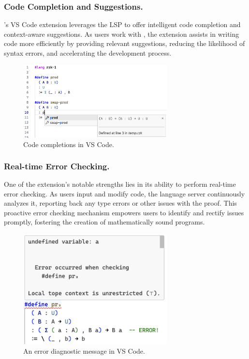 \subsubsection{Code Completion and Suggestions.}

\Rzk{}'s VS Code extension leverages the LSP to offer intelligent code completion
and context-aware suggestions. As users work with \Rzk{}, the extension assists
in writing code more efficiently by providing relevant suggestions, reducing
the likelihood of syntax errors, and accelerating the development process.

\begin{figure}
  \centering
  \includegraphics[width=0.7\textwidth]{figs/code-completions.png}
  \caption{Code completions in VS Code.}
  \label{figure:code-completions}
\end{figure}

\subsubsection{Real-time Error Checking.}

One of the extension's notable strengths lies in its ability to perform real-time error checking.
As users input and modify code, the language server continuously analyzes it,
reporting back any type errors or other issues with the proof.
This proactive error checking mechanism empowers users to identify and rectify issues promptly,
fostering the creation of mathematically sound programs.

\begin{figure}
  \centering
  \includegraphics[width=0.7\textwidth]{figs/diagnostic-message.png}
  \caption{An error diagnostic message in VS Code.}
  \label{figure:diagnostic-message}
\end{figure}

